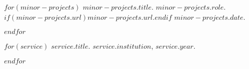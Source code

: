 \documentclass[11pt,article,oneside]{memoir}
\begin{document}
$for(minor-projects)$
\ind \emph{$minor-projects.title$}. $minor-projects.role$. $if(minor-projects.url)$\href{$minor-projects.url$}{$minor-projects.url$}.$endif$ $minor-projects.date$.
\smallskip

$endfor$

\bigskip
\pagebreak[1]


%
%
%
%
%
%

$for(service)$
\ind $service.title$. $service.institution$, $service.year$.

\pagebreak[1]
$endfor$

\smallskip
\bigskip

%
%
%
%

\thispagestyle{jtmcolophon}
\end{document}
